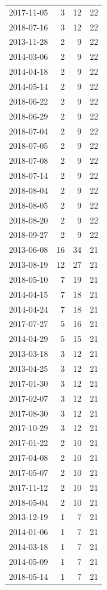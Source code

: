\begin{tabular}{lrrr}
2017-11-05 & 3 & 12 & 22 \\
2018-07-16 & 3 & 12 & 22 \\
2013-11-28 & 2 & 9 & 22 \\
2014-03-06 & 2 & 9 & 22 \\
2014-04-18 & 2 & 9 & 22 \\
2014-05-14 & 2 & 9 & 22 \\
2018-06-22 & 2 & 9 & 22 \\
2018-06-29 & 2 & 9 & 22 \\
2018-07-04 & 2 & 9 & 22 \\
2018-07-05 & 2 & 9 & 22 \\
2018-07-08 & 2 & 9 & 22 \\
2018-07-14 & 2 & 9 & 22 \\
2018-08-04 & 2 & 9 & 22 \\
2018-08-05 & 2 & 9 & 22 \\
2018-08-20 & 2 & 9 & 22 \\
2018-09-27 & 2 & 9 & 22 \\
2013-06-08 & 16 & 34 & 21 \\
2013-08-19 & 12 & 27 & 21 \\
2018-05-10 & 7 & 19 & 21 \\
2014-04-15 & 7 & 18 & 21 \\
2014-04-24 & 7 & 18 & 21 \\
2017-07-27 & 5 & 16 & 21 \\
2014-04-29 & 5 & 15 & 21 \\
2013-03-18 & 3 & 12 & 21 \\
2013-04-25 & 3 & 12 & 21 \\
2017-01-30 & 3 & 12 & 21 \\
2017-02-07 & 3 & 12 & 21 \\
2017-08-30 & 3 & 12 & 21 \\
2017-10-29 & 3 & 12 & 21 \\
2017-01-22 & 2 & 10 & 21 \\
2017-04-08 & 2 & 10 & 21 \\
2017-05-07 & 2 & 10 & 21 \\
2017-11-12 & 2 & 10 & 21 \\
2018-05-04 & 2 & 10 & 21 \\
2013-12-19 & 1 & 7 & 21 \\
2014-01-06 & 1 & 7 & 21 \\
2014-03-18 & 1 & 7 & 21 \\
2014-05-09 & 1 & 7 & 21 \\
2018-05-14 & 1 & 7 & 21 \\

\end{tabular}
